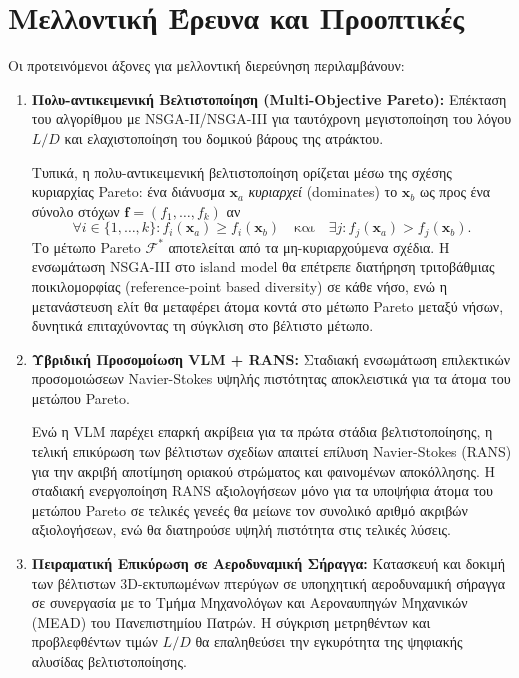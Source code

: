 \section{Μελλοντική Έρευνα και Προοπτικές}
\label{sec:conclusion_future}

Οι προτεινόμενοι άξονες για μελλοντική διερεύνηση περιλαμβάνουν:
\begin{enumerate}
    \item \textbf{Πολυ-αντικειμενική Βελτιστοποίηση (Multi-Objective Pareto):} Επέκταση του αλγορίθμου με NSGA-II/NSGA-III για ταυτόχρονη μεγιστοποίηση του λόγου $L/D$ και ελαχιστοποίηση του δομικού βάρους της ατράκτου.

    Τυπικά, η πολυ-αντικειμενική βελτιστοποίηση ορίζεται μέσω της σχέσης κυριαρχίας Pareto: ένα διάνυσμα $\bm{x}_a$ \emph{κυριαρχεί} (dominates) το $\bm{x}_b$ ως προς ένα σύνολο στόχων $\bm{f} = (f_1, \ldots, f_k)$ αν
    \begin{equation}
    \label{eq:pareto_dominance}
        \forall i \in \{1,\ldots,k\}: f_i(\bm{x}_a) \ge f_i(\bm{x}_b)
        \quad \text{και} \quad
        \exists j: f_j(\bm{x}_a) > f_j(\bm{x}_b).
    \end{equation}
    Το μέτωπο Pareto $\mathcal{F}^*$ αποτελείται από τα μη-κυριαρχούμενα σχέδια. Η ενσωμάτωση NSGA-III στο island model θα επέτρεπε διατήρηση τριτοβάθμιας ποικιλομορφίας (reference-point based diversity) σε κάθε νήσο, ενώ η μετανάστευση ελίτ θα μεταφέρει άτομα κοντά στο μέτωπο Pareto μεταξύ νήσων, δυνητικά επιταχύνοντας τη σύγκλιση στο βέλτιστο μέτωπο.

    \item \textbf{Υβριδική Προσομοίωση VLM + RANS:} Σταδιακή ενσωμάτωση επιλεκτικών προσομοιώσεων Navier-Stokes υψηλής πιστότητας αποκλειστικά για τα άτομα του μετώπου Pareto.

    Ενώ η VLM παρέχει επαρκή ακρίβεια για τα πρώτα στάδια βελτιστοποίησης, η τελική επικύρωση των βέλτιστων σχεδίων απαιτεί επίλυση Navier-Stokes (RANS) για την ακριβή αποτίμηση οριακού στρώματος και φαινομένων αποκόλλησης. Η σταδιακή ενεργοποίηση RANS αξιολογήσεων μόνο για τα υποψήφια άτομα του μετώπου Pareto σε τελικές γενεές θα μείωνε τον συνολικό αριθμό ακριβών αξιολογήσεων, ενώ θα διατηρούσε υψηλή πιστότητα στις τελικές λύσεις.

    \item \textbf{Πειραματική Επικύρωση σε Αεροδυναμική Σήραγγα:} Κατασκευή και δοκιμή των βέλτιστων 3D-εκτυπωμένων πτερύγων σε υποηχητική αεροδυναμική σήραγγα σε συνεργασία με το Τμήμα Μηχανολόγων και Αεροναυπηγών Μηχανικών (MEAD) του Πανεπιστημίου Πατρών. Η σύγκριση μετρηθέντων και προβλεφθέντων τιμών $L/D$ θα επαληθεύσει την εγκυρότητα της ψηφιακής αλυσίδας βελτιστοποίησης.


\end{enumerate}
